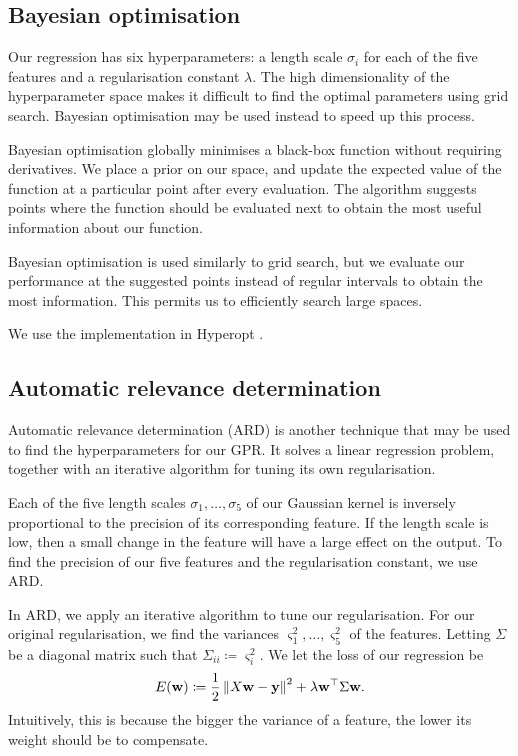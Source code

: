 \documentclass[11pt,twoside,openright]{report}
\newcommand\bw{\mathbf{w}}
\newcommand\by{\mathbf{y}}
\newcommand\norm[1]{\left\|#1\right\|}
\begin{document}
  \subsection{Bayesian optimisation}
  Our regression has six hyperparameters: a length scale $\sigma_i$ for each of the five features and a regularisation constant $\lambda$. The high dimensionality of the hyperparameter space makes it difficult to find the optimal parameters using grid search. Bayesian optimisation may be used instead to speed up this process.

  Bayesian optimisation globally minimises a black-box function without requiring derivatives. We place a prior on our space, and update the expected value of the function at a particular point after every evaluation. The algorithm suggests points where the function should be evaluated next to obtain the most useful information about our function.

  Bayesian optimisation is used similarly to grid search, but we evaluate our performance at the suggested points instead of regular intervals to obtain the most information. This permits us to efficiently search large spaces.

  We use the implementation in Hyperopt \citep{Hyperopt}.

\subsection{Automatic relevance determination}
Automatic relevance determination (ARD) is another technique that may be used to find the hyperparameters for our GPR. \citep{GPModelSelection} It solves a linear regression problem, together with an iterative algorithm for tuning its own regularisation.

Each of the five length scales $\sigma_1, \dots, \sigma_5$ of our Gaussian kernel is inversely proportional to the precision of its corresponding feature. If the length scale is low, then a small change in the feature will have a large effect on the output. To find the precision of our five features and the regularisation constant, we use ARD.

In ARD, we apply an iterative algorithm to tune our regularisation. For our original regularisation, we find the variances $\varsigma_1^2, \dots, \varsigma_5^2$ of the features. Letting $\Sigma$ be a diagonal matrix such that $\Sigma_{ii} \coloneqq \varsigma_i^2$. We let the loss of our regression be\[
  E(\bw) \coloneqq \frac12\norm{X\bw - \by}^2 + \lambda \bw^\top \Sigma \bw \text.
\] Intuitively, this is because the bigger the variance of a feature, the lower its weight should be to compensate.
\end{document}

